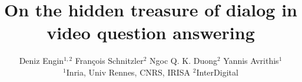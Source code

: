 \documentclass[10pt,twocolumn,letterpaper]{article}
\begin{document}
\title{On the hidden treasure of dialog in video question answering}

\author{Deniz Engin$^{1,2}$ \qquad Fran{ç}ois Schnitzler$^{2}$ \qquad Ngoc Q. K. Duong$^{2}$ \qquad  Yannis Avrithis$^{1}$ \\ 
$^{1}$Inria, Univ Rennes, CNRS, IRISA \qquad $^{2}$InterDigital}

\maketitle
\ificcvfinal\thispagestyle{empty}\fi



\newcommand{\head}[1]{{\smallskip\noindent\textbf{#1}}}
\newcommand{\alert}[1]{{\color{red}{#1}}}
\newcommand{\sm}{\scriptsize}
\newcommand{\eq}[1]{(\ref{eq:#1})}

\newcommand{\Th}[1]{\textsc{#1}}
\newcommand{\mr}[2]{\multirow{#1}{*}{#2}}
\newcommand{\mc}[2]{\multicolumn{#1}{c}{#2}}
\newcommand{\tb}[1]{\textbf{#1}}
\newcommand{\ch}{\checkmark}

\newcommand{\red}[1]{{\color{red}{#1}}}
\newcommand{\blue}[1]{{\color{blue}{#1}}}
\newcommand{\green}[1]{{\color{green}{#1}}}
\newcommand{\gray}[1]{{\color{gray}{#1}}}

\newcommand{\citeme}[1]{\red{[XX]}}
\newcommand{\refme}[1]{\red{(XX)}}

\newcommand{\fig}[2][1]{\texttt{[image: fig/\#2]}}
\newcommand{\figh}[2][1]{\texttt{[image: fig/\#2]}}



\newcommand{\tran}{^\top}
\newcommand{\mtran}{^{-\top}}
\newcommand{\zcol}{\mathbf{0}}
\newcommand{\zrow}{\zcol\tran}

\newcommand{\ind}{\mathbbm{1}}
\newcommand{\expect}{\mathbb{E}}
\newcommand{\nat}{\mathbb{N}}
\newcommand{\zahl}{\mathbb{Z}}
\newcommand{\real}{\mathbb{R}}
\newcommand{\proj}{\mathbb{P}}
\newcommand{\prob}{\mathbf{Pr}}
\newcommand{\normal}{\mathcal{N}}

\newcommand{\mif}{\textrm{if}\ }
\newcommand{\other}{\textrm{otherwise}}
\newcommand{\minimize}{\textrm{minimize}\ }
\newcommand{\maximize}{\textrm{maximize}\ }
\newcommand{\st}{\textrm{subject\ to}\ }

\newcommand{\id}{\operatorname{id}}
\newcommand{\const}{\operatorname{const}}
\newcommand{\sgn}{\operatorname{sgn}}
\newcommand{\var}{\operatorname{Var}}
\newcommand{\mean}{\operatorname{mean}}
\newcommand{\trace}{\operatorname{tr}}
\newcommand{\diag}{\operatorname{diag}}
\newcommand{\vect}{\operatorname{vec}}
\newcommand{\cov}{\operatorname{cov}}
\newcommand{\sign}{\operatorname{sign}}
\newcommand{\prj}{\operatorname{proj}}
\end{document}

